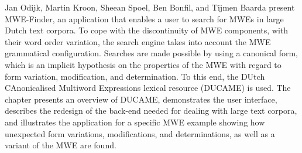 \begin{refsection}
Jan Odijk, Martin Kroon, Sheean Spoel, Ben Bonfil, and Tijmen Baarda present MWE-Finder, an application that enables a user to search for MWEs in large Dutch text corpora. To cope with the discontinuity of MWE components, with their word order variation, 
the search engine takes into account the MWE grammatical configuration. 
Searches are made possible by using a canonical     form, which is an implicit hypothesis on the properties of the MWE with regard to form variation, modification, and determination. 
To this end, the DUtch CAnonicalised Multiword Expressions lexical resource (DUCAME) is used. %
The chapter presents an overview of DUCAME, demonstrates the user interface, describes the redesign of the back-end needed for dealing with large text corpora, and illustrates the application for a specific MWE example showing how unexpected form variations, modifications, and determinations, as well as a variant of the MWE are found.


\end{refsection}
